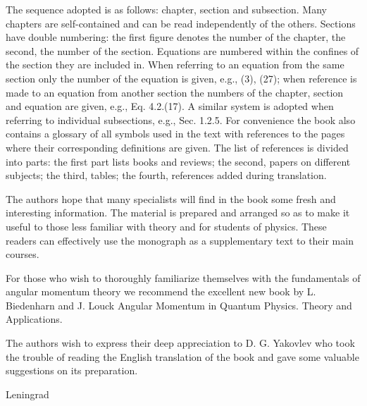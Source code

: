 The sequence adopted is as follows: chapter, section and subsection. Many chapters are self-contained and can be read independently of the others. Sections have double numbering: the first figure denotes the number of the chapter, the second, the number of the section. Equations are numbered within the confines of the section they are included in. When referring to an equation from the same section only the number of the equation is given, e.g., (3), (27); when reference is made to an equation from another section the numbers of the chapter, section and equation are given, e.g., Eq. 4.2.(17). A similar system is adopted when referring to individual subsections, e.g., Sec. 1.2.5. For convenience the book also contains a glossary of all symbols used in the text with references to the pages where their corresponding definitions are given. The list of references is divided into parts: the first part lists books and reviews; the second, papers on different subjects; the third, tables; the fourth, references added during translation.

The authors hope that many specialists will find in the book some fresh and interesting information. The material is prepared and arranged so as to make it useful to those less familiar with theory and for students of physics. These readers can effectively use the monograph as a supplementary text to their main courses.

For those who wish to thoroughly familiarize themselves with the fundamentals of angular momentum theory we recommend the excellent new book by L. Biedenharn and J. Louck \cite{ref132} Angular Momentum in Quantum Physics. Theory and Applications.

The authors wish to express their deep appreciation to D. G. Yakovlev who took the trouble of reading the English translation of the book and gave some valuable suggestions on its preparation.

Leningrad